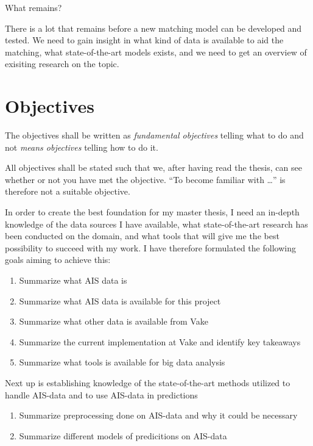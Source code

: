 \begin{info}
	What remains?
\end{info}
There is a lot that remains before a new matching model can be developed and tested. We need to gain insight in what kind of data is available to aid the matching, what state-of-the-art models exists, and we need to get an overview of exisiting research on the topic. 





\section{Objectives}
\label{sec:objectives}
\begin{info}
	The objectives shall be written as \emph{fundamental objectives} telling what to do and not \emph{means objectives} telling how to do it.

	All objectives shall be stated such that we, after having read the thesis, can see whether or not you have met the objective. ``To become familiar with \ldots'' is therefore not a suitable objective.
\end{info}
In order to create the best foundation for my master thesis, I need an in-depth knowledge of the data sources I have available, what state-of-the-art research has been conducted on the domain, and what tools that will give me the best possibility to succeed with my work. I have therefore formulated the following goals aiming to achieve this:
\begin{enumerate}
	\item Summarize what AIS data is
	\item Summarize what AIS data is available for this project
	\item Summarize what other data is available from Vake
	\item Summarize the current implementation at Vake and identify key takeaways
	\item Summarize what tools is available for big data analysis
\end{enumerate}

Next up is establishing knowledge of the state-of-the-art methods utilized to handle AIS-data and to use AIS-data in predictions
\begin{enumerate}
	\item Summarize preprocessing done on AIS-data and why it could be necessary
	\item Summarize different models of predicitions on AIS-data
\end{enumerate}

